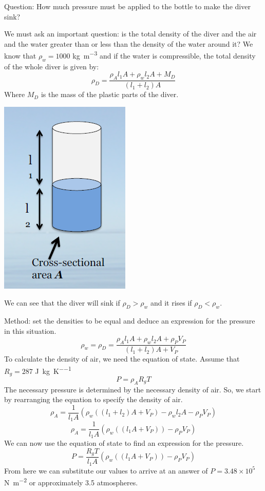 \documentclass[class=report, crop=false, 12pt,a4paper]{standalone}
\begin{document}
Question: How much pressure must be applied to the bottle to make the diver sink?

We must ask an important question: is the total density of the diver and the air and the water greater than or less than the density of the water around it? We know that \( \rho_w = 1000\) \si{kg\per\meter\cubed} and if the water is compressible, the total density of the whole diver is given by:
\[ \rho_D = \frac{\rho_A l_1 A + \rho_w l_2 A + M_D}{(l_1 + l_2)A} \]
Where \(M_D\) is the mass of the plastic parts of the diver. 
\begin{center}
  \includegraphics[width = 0.4 \textwidth]{../img/CartesianDiver}
\end{center}
We can see that the diver will sink if \(\rho_D > \rho_w\) and it rises if \(\rho_D < \rho_w\).

Method: set the densities to be equal and deduce an expression for the pressure in this situation. 
\[ \rho_w = \rho_D = \frac{\rho_A l_1 A + \rho_w l_2 A + \rho_P V_P}{(l_1 + l_2)A + V_P} \]
To calculate the density of air, we need the equation of state. Assume that \( R_g = 287\) \si{\joule\per\kg\per\kelvin}
\[ P = \rho_A R_g T\]
The necessary pressure is determined by the necessary density of air. So, we start by rearranging the equation to specify the density of air. 
\[ \rho_A = \frac{1}{l_1 A} \left( \rho_w \left( (l_1 + l_2)A + V_P \right) - \rho_w l_2 A - \rho_P V_P \right)\]
\[ \rho_A = \frac{1}{l_1 A} \left( \rho_w \left( (l_1A + V_P) \right) -\rho_P V_P \right) \]
We can now use the equation of state to find an expression for the pressure. 
\[ P = \frac{R_g T}{l_1 A} \left( \rho_w \left( (l_1A + V_P) \right) -\rho_P V_P \right) \]
From here we can substitute our values to arrive at an answer of \( P = 3.48 \times 10^5\) \si{\newton\per\meter\squared} or approximately 3.5 atmospheres. 
\end{document}
